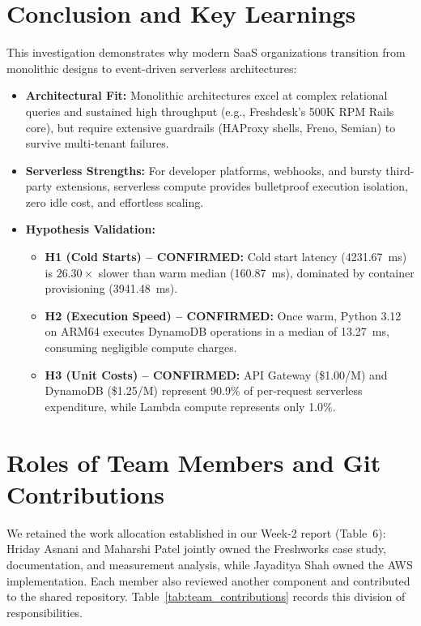 \documentclass[10pt,a4paper]{article}
\begin{document}
\section{Conclusion and Key Learnings}
This investigation demonstrates why modern SaaS organizations transition from monolithic designs to event-driven serverless architectures:
\begin{itemize}
    \item \textbf{Architectural Fit:} Monolithic architectures excel at complex relational queries and sustained high throughput (e.g., Freshdesk's 500K RPM Rails core), but require extensive guardrails (HAProxy shells, Freno, Semian) to survive multi-tenant failures.
    \item \textbf{Serverless Strengths:} For developer platforms, webhooks, and bursty third-party extensions, serverless compute provides bulletproof execution isolation, zero idle cost, and effortless scaling.
    \item \textbf{Hypothesis Validation:}
    \begin{itemize}
        \item \textbf{H1 (Cold Starts) -- CONFIRMED:} Cold start latency (4231.67~ms) is $26.30\times$ slower than warm median (160.87~ms), dominated by container provisioning (3941.48~ms).
        \item \textbf{H2 (Execution Speed) -- CONFIRMED:} Once warm, Python 3.12 on ARM64 executes DynamoDB operations in a median of 13.27~ms, consuming negligible compute charges.
        \item \textbf{H3 (Unit Costs) -- CONFIRMED:} API Gateway (\$1.00/M) and DynamoDB (\$1.25/M) represent 90.9\% of per-request serverless expenditure, while Lambda compute represents only 1.0\%.
    \end{itemize}
\end{itemize}

\section{Roles of Team Members and Git Contributions}
We retained the work allocation established in our Week-2 report (Table~6): Hriday Asnani and Maharshi Patel jointly owned the Freshworks case study, documentation, and measurement analysis, while Jayaditya Shah owned the AWS implementation. Each member also reviewed another component and contributed to the shared repository. Table~\ref{tab:team_contributions} records this division of responsibilities.
\end{document}
